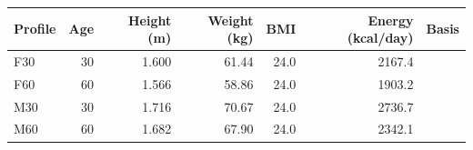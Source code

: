 \begin{tabularx}{\textwidth}{lrrrrrX}
\toprule
Profile & Age & Height (m) & Weight (kg) & BMI & Energy (kcal/day) & Basis \\
\midrule
F30 & 30 & 1.600 & 61.44 & 24.0 & 2167.4 & \cite{ibge2010anthropometry,brasil2004sisvan,nases2023energy} \\
\midrule
F60 & 60 & 1.566 & 58.86 & 24.0 & 1903.2 & \cite{ibge2010anthropometry,brasil2004sisvan,nases2023energy} \\
\midrule
M30 & 30 & 1.716 & 70.67 & 24.0 & 2736.7 & \cite{ibge2010anthropometry,brasil2004sisvan,nases2023energy} \\
\midrule
M60 & 60 & 1.682 & 67.90 & 24.0 & 2342.1 & \cite{ibge2010anthropometry,brasil2004sisvan,nases2023energy} \\
\midrule
\bottomrule
\end{tabularx}
